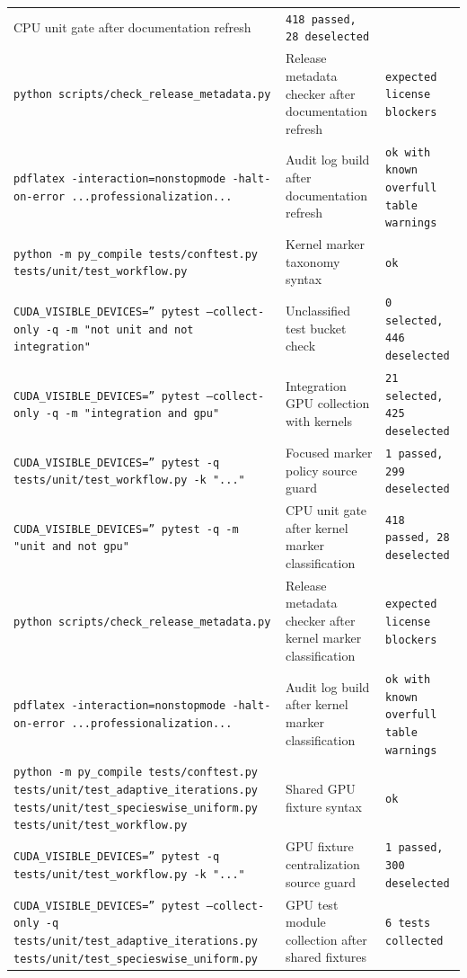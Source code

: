 \documentclass[11pt]{article}
\begin{document}
\begin{center}
\begin{tabular}{lll}
CPU unit gate after documentation refresh &
\texttt{418 passed, 28 deselected} \\
\texttt{python scripts/check\_release\_metadata.py} &
Release metadata checker after documentation refresh &
\texttt{expected license blockers} \\
\texttt{pdflatex -interaction=nonstopmode -halt-on-error ...professionalization...} &
Audit log build after documentation refresh &
\texttt{ok with known overfull table warnings} \\
\texttt{python -m py\_compile tests/conftest.py tests/unit/test\_workflow.py} &
Kernel marker taxonomy syntax &
\texttt{ok} \\
\texttt{CUDA\_VISIBLE\_DEVICES='' pytest --collect-only -q -m "not unit and not integration"} &
Unclassified test bucket check &
\texttt{0 selected, 446 deselected} \\
\texttt{CUDA\_VISIBLE\_DEVICES='' pytest --collect-only -q -m "integration and gpu"} &
Integration GPU collection with kernels &
\texttt{21 selected, 425 deselected} \\
\texttt{CUDA\_VISIBLE\_DEVICES='' pytest -q tests/unit/test\_workflow.py -k "..."} &
Focused marker policy source guard &
\texttt{1 passed, 299 deselected} \\
\texttt{CUDA\_VISIBLE\_DEVICES='' pytest -q -m "unit and not gpu"} &
CPU unit gate after kernel marker classification &
\texttt{418 passed, 28 deselected} \\
\texttt{python scripts/check\_release\_metadata.py} &
Release metadata checker after kernel marker classification &
\texttt{expected license blockers} \\
\texttt{pdflatex -interaction=nonstopmode -halt-on-error ...professionalization...} &
Audit log build after kernel marker classification &
\texttt{ok with known overfull table warnings} \\
\texttt{python -m py\_compile tests/conftest.py tests/unit/test\_adaptive\_iterations.py tests/unit/test\_specieswise\_uniform.py tests/unit/test\_workflow.py} &
Shared GPU fixture syntax &
\texttt{ok} \\
\texttt{CUDA\_VISIBLE\_DEVICES='' pytest -q tests/unit/test\_workflow.py -k "..."} &
GPU fixture centralization source guard &
\texttt{1 passed, 300 deselected} \\
\texttt{CUDA\_VISIBLE\_DEVICES='' pytest --collect-only -q tests/unit/test\_adaptive\_iterations.py tests/unit/test\_specieswise\_uniform.py} &
GPU test module collection after shared fixtures &
\texttt{6 tests collected} \\

\end{tabular}
\end{center}
\end{document}

